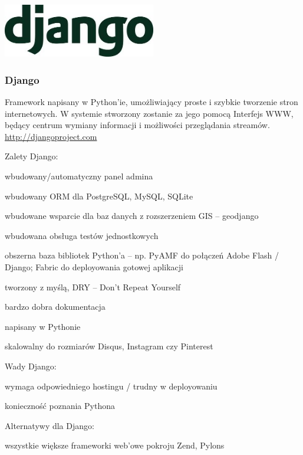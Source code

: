 \begin{minipage}{\textwidth}
    \begin{center}
        \includegraphics[width=0.5\textwidth]{img/logos/django.jpg}
    \end{center}
    \subsubsection{Django}
    Framework napisany w Python'ie, umożliwiający proste i szybkie tworzenie stron internetowych. W systemie stworzony zostanie za jego pomocą Interfejs WWW, będący centrum wymiany informacji i możliwości przeglądania streamów. \url{http://djangoproject.com}

    Zalety Django:
    \begin{packed_item}
        \item{wbudowany/automatyczny panel admina}
        \item{wbudowany ORM dla PostgreSQL, MySQL, SQLite}
        \item{wbudowane wsparcie dla baz danych z rozszerzeniem GIS -- geodjango}
        \item{wbudowana obsługa testów jednostkowych}
        \item{obszerna baza bibliotek Python'a -- np. PyAMF do połączeń Adobe Flash / Django; Fabric do deployowania gotowej aplikacji}
        \item{tworzony z myślą, DRY -- Don't Repeat Yourself}
        \item{bardzo dobra dokumentacja}
        \item{napisany w Pythonie}
        \item{skalowalny do rozmiarów Disqus, Instagram czy Pinterest}
    \end{packed_item}

    Wady Django:
    \begin{packed_item}
        \item{wymaga odpowiedniego hostingu / trudny w deployowaniu}
        \item{konieczność poznania Pythona}
    \end{packed_item}

    Alternatywy dla Django:
    \begin{packed_item}
        \item{wszystkie większe frameworki web'owe pokroju Zend, Pylons}
    \end{packed_item}
\end{minipage}

